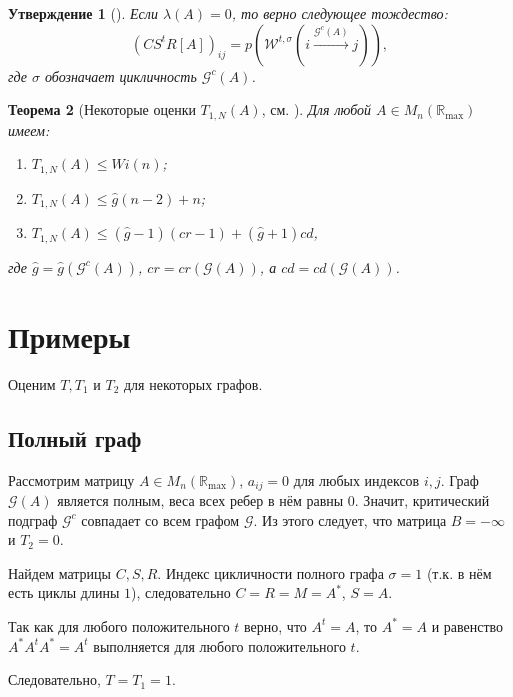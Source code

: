 \documentclass[12pt]{article}
\newtheorem{theorem}{Теорема}[section]
\newtheorem{proposition}[theorem]{Утверждение}
\begin{document}
\begin{proposition}[\cite{15WeakCSRExpantion}] \label{entriesInCSR}
Если $\lambda(A) = 0$, то верно следующее тождество:
\begin{equation}
    (CS^tR[A])_{ij} = p(\mathcal{W}^{t, \sigma}(i \xrightarrow{\mathcal{G}^c(A)} j)),
\end{equation}
где $\sigma$ обозначает цикличность $\mathcal{G}^c(A)$.
\end{proposition}
\begin{theorem}[Некоторые оценки $T_{1, N}(A)$, см. \cite{15WeakCSRExpantion}]
\label{upperBounds}
Для любой $A \in M_n(\mathbb{R}_{\max})$ имеем:
\begin{enumerate} 
    \item $T_{1, N}(A) \le Wi(n)$;
    \item $T_{1, N}(A) \le \hat{g}(n - 2) + n$;
    \item $T_{1, N}(A) \le (\hat{g} - 1)(cr - 1) + (\hat{g} + 1) cd$,
\end{enumerate}
где $\hat{g} = \hat{g}(\mathcal{G}^c(A))$, $cr = cr(\mathcal{G}(A))$, а $cd = cd(\mathcal{G}(A))$.
\end{theorem}

\section{Примеры}
Оценим $T, T_1$ и $T_2$ для некоторых графов.

\subsection{Полный граф}
Рассмотрим матрицу $A \in M_n(\mathbb{R}_{\max})$, $a_{ij} = 0$ для любых индексов $i, j$. Граф $\mathcal{G}(A)$ является полным, веса всех ребер в нём равны $0$. Значит, критический подграф $\mathcal{G}^c$ совпадает со всем графом $\mathcal{G}$. Из этого следует, что матрица $B = -\infty$ и $T_2 = 0$.

Найдем матрицы $C, S, R$. Индекс цикличности полного графа $\sigma = 1 $ (т.к. в нём есть циклы длины $1$), следовательно $C = R = M = A^*$, $S = A$.

Так как для любого положительного $t$ верно, что $A^t = A$, то $A^* = A$ и равенство $A^*A^tA^* = A^t$ выполняется для любого положительного $t$.

Следовательно, $T = T_1 = 1$.
\end{document}
